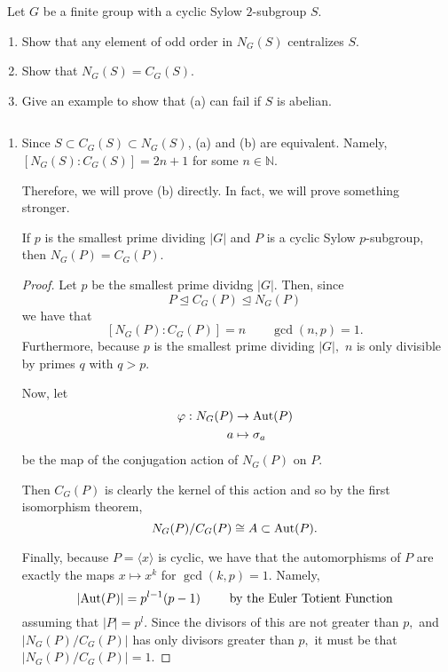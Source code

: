 \documentclass[12pt]{AlgebraQual}
\begin{document}
\begin{problem} $\,$
Let $G$ be a finite group with a cyclic Sylow $2$-subgroup $S.$
\begin{enumerate}[label=(\alph*)]
    \item Show that any element of odd order in $N_G(S)$ centralizes $S.$
    \item Show that $N_G(S)=C_G(S).$
    \item Give an example to show that (a) can fail if $S$ is abelian.
\end{enumerate}
\end{problem}


\begin{solution}$\,$
\begin{enumerate}[label=(\alph*)]
    \item Since $S\subset C_G(S)\subset N_G(S)$, (a) and (b) are equivalent. Namely, $[N_G(S):C_G(S)]=2n+1$ for some $n\in\mathbb{N}$.

    Therefore, we will prove (b) directly. In fact, we will prove something stronger.

    \begin{claim} If $p$ is the smallest prime dividing $|G|$ and $P$ is a cyclic Sylow $p$-subgroup, then $N_G(P)=C_G(P).$
    \begin{proof} Let $p$ be the smallest prime dividng $|G|.$ Then, since $$P\trianglelefteq C_G(P)\trianglelefteq N_G(P)$$ we have that $$[N_G(P):C_G(P)]=n\qquad \gcd(n,p)=1.$$ Furthermore, because $p$ is the smallest prime dividing $|G|,$ $n$ is only divisible by primes $q$ with $q>p.$

    Now, let \begin{align*}
        \varphi:N_G(P)&\to\text{Aut}(P)\\
        a&\mapsto\sigma_a
    \end{align*} be the map of the conjugation action of $N_G(P)$ on $P.$

    Then $C_G(P)$ is clearly the kernel of this action and so by the first isomorphism theorem, $$N_G(P)/C_G(P)\cong A\subset\text{Aut}(P).$$

    Finally, because $P=\langle x\rangle$ is cyclic, we have that the automorphisms of $P$ are exactly the maps $x\mapsto x^k$ for $\gcd(k,p)=1$. Namely, $$|\text{Aut}(P)|=p^{l-1}(p-1)\qquad\text{ by the Euler Totient Function}$$ assuming that $|P|=p^l$. Since the divisors of this are not greater than $p,$ and $|N_G(P)/C_G(P)|$ has only divisors greater than $p,$ it must be that $|N_G(P)/C_G(P)|=1.$


\end{proof}
\end{claim}
\end{enumerate}
\end{solution}
\end{document}

